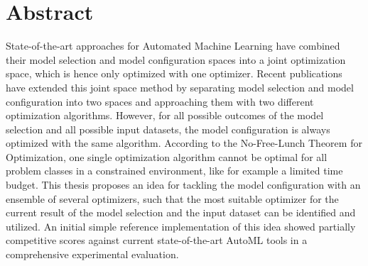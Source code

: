 %
\chapter*{Abstract}
\label{sec:abstract}
\vspace*{-15mm}

State-of-the-art approaches for Automated Machine Learning have combined their model selection and model configuration spaces into a joint optimization space, which is hence only optimized with one optimizer.
Recent publications have extended this joint space method by separating model selection and model configuration into two spaces and approaching them with two different optimization algorithms.
However, for all possible outcomes of the model selection and all possible input datasets, the model configuration is always optimized with the same algorithm.
According to the No-Free-Lunch Theorem for Optimization, one single optimization algorithm cannot be optimal for all problem classes in a constrained environment, like for example a limited time budget.
This thesis proposes an idea for tackling the model configuration with an ensemble of several optimizers, such that the most suitable optimizer for the current result of the model selection and the input dataset can be identified and utilized.
An initial simple reference implementation of this idea showed partially competitive scores against current state-of-the-art AutoML tools in a comprehensive experimental evaluation.
\vspace*{10mm}

